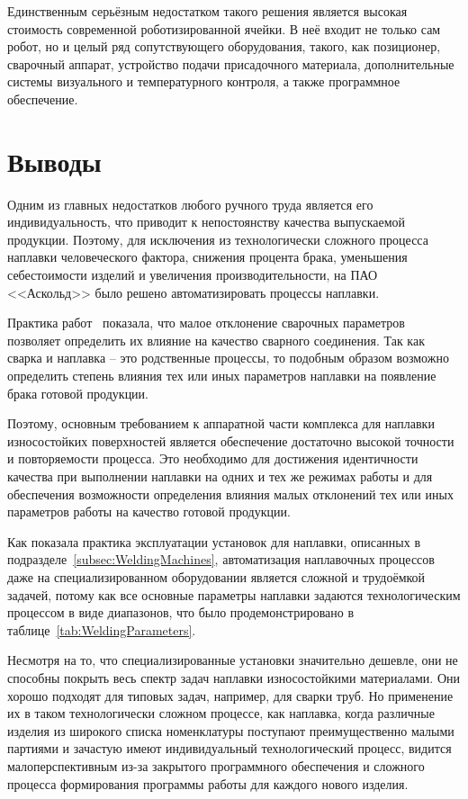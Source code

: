 Единственным серьёзным недостатком такого решения является высокая стоимость современной роботизированной ячейки.
В неё входит не только сам робот, но и целый ряд сопутствующего оборудования, такого, как позиционер, сварочный аппарат, устройство подачи присадочного материала, дополнительные системы визуального и температурного контроля, а также программное обеспечение.


\section{Выводы}
Одним из главных недостатков любого ручного труда является его индивидуальность, что приводит к непостоянству качества выпускаемой продукции.
Поэтому, для исключения из технологически сложного процесса наплавки человеческого фактора, снижения процента брака, уменьшения себестоимости изделий и увеличения производительности, на ПАО <<Аскольд>> было решено автоматизировать процессы наплавки.

Практика работ~\cite{Al_Sarraf_2016, Dai_2011, Gwan_Hyung_Kim, Liang_2011, Lin_2018, Xu_2008} показала, что малое отклонение сварочных параметров позволяет определить их влияние на качество сварного соединения.
Так как сварка и наплавка -- это родственные процессы, то подобным образом возможно определить степень влияния тех или иных параметров наплавки на появление брака готовой продукции.

Поэтому, основным требованием к аппаратной части комплекса для наплавки износостойких поверхностей является обеспечение достаточно высокой точности и повторяемости процесса.
Это необходимо для достижения идентичности качества при выполнении наплавки на одних и тех же режимах работы и для обеспечения возможности определения влияния малых отклонений тех или иных параметров работы на качество готовой продукции.

Как показала практика эксплуатации установок для наплавки, описанных в подразделе~\ref{subsec:WeldingMachines}, автоматизация наплавочных процессов даже на специализированном оборудовании является сложной и трудоёмкой задачей, потому как все основные параметры наплавки задаются технологическим процессом в виде диапазонов, что было продемонстрировано в таблице~\ref{tab:WeldingParameters}.

Несмотря на то, что специализированные установки значительно дешевле, они не способны покрыть весь спектр задач наплавки износостойкими материалами.
Они хорошо подходят для типовых задач, например, для сварки труб.
Но применение их в таком технологически сложном процессе, как наплавка, когда различные изделия из широкого списка номенклатуры поступают преимущественно малыми партиями и зачастую имеют индивидуальный технологический процесс, видится малоперспективным из-за закрытого программного обеспечения и сложного процесса формирования программы работы для каждого нового изделия.

